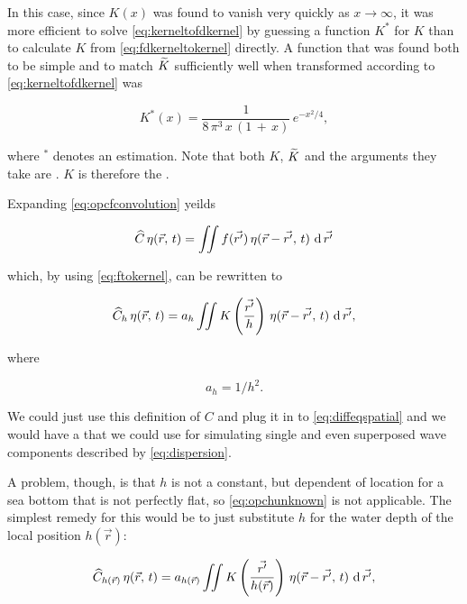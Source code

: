 In this case, since $K(x)$ was found to vanish very quickly as $x\rightarrow\infty$, it was more efficient to solve \eqref{eq:kerneltofdkernel} by guessing a function $K^*$ for $K$ than to calculate $K$ from \eqref{eq:fdkerneltokernel} directly. A function that was found both to be simple and to match $\widetilde{K}$ sufficiently well when transformed according to \eqref{eq:kerneltofdkernel} was

\begin{equation} \label{eq:empirical}
K^*(x) = \frac{1}{8\,\pi^3\,x\,(1\,+\,x)}\,e^{-x^2/4},
\end{equation}

where $^*$ denotes an estimation. Note that both $K$, $\widetilde{K}$ and the arguments they take are . $K$ is therefore the .

%
%

Expanding \eqref{eq:opcfconvolution} yeilds

\begin{equation} \label{eq:opcfintegral}
\widehat{C}\,\eta(\vec{r},\,t) = \iint f(\vec{r'})\,\eta(\vec{r}-\vec{r'},\,t)\,\operatorname{d}\vec{r'}
\end{equation}

which, by using \eqref{eq:ftokernel}, can be rewritten to

\begin{equation} \label{eq:opchunknown}
\widehat{C}_h\,\eta(\vec{r},\,t) = a_h\iint K\left(\frac{\vec{r'}}{h}\right)\,\eta(\vec{r}-\vec{r'},\,t)\,\operatorname{d}\vec{r'},
\end{equation}

where

\begin{equation} \label{eq:aofh}
a_h = 1/h^2.
\end{equation}

We could just use this definition of $C$ and plug it in to \eqref{eq:diffeqspatial} and we would have a \PDE that we could use for simulating single and even superposed wave components described by \eqref{eq:dispersion}.

A problem, though, is that $h$ is not a constant, but dependent of location for a sea bottom that is not perfectly flat, so \eqref{eq:opchunknown} is not applicable. The simplest remedy for this would be to just substitute $h$ for the water depth of the local position $h(\vec{r})$:

\begin{equation} \label{eq:opchlocal}
\widehat{C}_{h(\vec{r})}\,\eta(\vec{r},\,t) = a_{h(\vec{r})}\iint K\left(\frac{\vec{r'}}{h(\vec{r})}\right)\,\eta(\vec{r}-\vec{r'},\,t)\,\operatorname{d}\vec{r'},
\end{equation}

